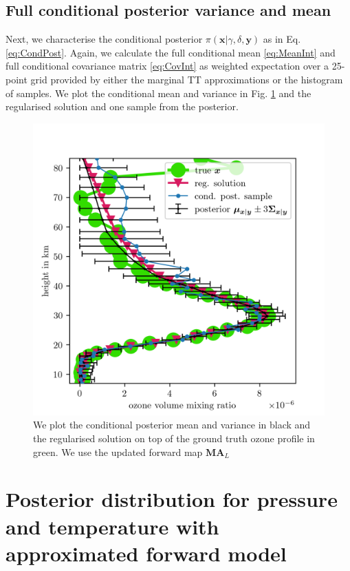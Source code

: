 \subsection{Full conditional posterior variance and mean}
Next, we characterise the conditional posterior $\pi(\bm{x}|\gamma, \delta, \bm{y})$ as in Eq. \ref{eq:CondPost}. 
Again, we calculate the full conditional mean \ref{eq:MeanInt} and full conditional covariance matrix \ref{eq:CovInt} as weighted expectation over a 25-point grid provided by either the marginal TT approximations or the histogram of samples.
We plot the conditional mean and variance in Fig. \ref{fig:O3SolplsReg} and the regularised solution and one sample from the posterior.
\begin{figure}[ht!]
	\centering
	\includegraphics{SecRecResinclRegandSampl.png}
	\caption[Ozone posterior mean and variance and the regularised solution compared to the ground truth.]{We plot the conditional posterior mean and variance in black and the regularised solution on top of the ground truth ozone profile in green. We use the updated forward map $\bm{M}\bm{A}_L$}
	\label{fig:O3SolplsReg}
\end{figure}
\clearpage

\section{Posterior distribution for pressure and temperature with approximated forward model}
\label{sec:postPT}

